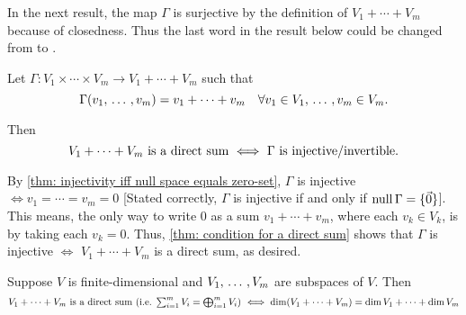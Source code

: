 In the next result, the map $\Gamma$ is surjective by the definition of $V_1 + \cdots + V_m$ because of closedness. Thus the last word in the result below could be changed from  to .

\begin{thm}
  \label{thm: products and direct sums}
  Let $\Gamma: V_1 \times \cdots \times V_m \to V_1 + \cdots + V_m$ such that
  \begin{equation}
    \Gamma(v_1, {\, \ldots \,\,}, v_m) = v_1 + \cdots + v_m \quad \forall v_1 \in V_1, {\, \ldots \,\,}, v_m \in V_m.
  \end{equation}

  Then
  \begin{equation}
    V_1 + \cdots + V_m$ is a direct sum $\iff$ $\Gamma$ is injective/invertible.$
  \end{equation}

\end{thm}
\begin{prf}
  By \ref{thm: injectivity iff null space equals zero-set}, $\Gamma$ is injective $\iff v_1 = \cdots = v_m = 0$ [Stated correctly, $\Gamma$ is injective if and only if $\operatorname{null} \Gamma = \{ \vec 0 \}$]. This means, the only way to write $0$ as a sum $v_1 + \cdots + v_m$, where each $v_k \in V_k$, is by taking each $v_k=0$. Thus, \ref{thm: condition for a direct sum} shows that $\Gamma$ is injective $\iff$ $V_1 + \cdots + V_m$ is a direct sum, as desired.
\end{prf}

\begin{thm}
  \label{thm: a sum is a direct sum if and only if the dimensions add up}
  Suppose $V$ is finite-dimensional and $V_1, {\, \ldots \,\,},V_m$ are subspaces of $V$. Then
  \begin{equation}
    V_1 + \cdots + V_m$ is a direct sum (i.e. $\sum_{i=1}^m V_i = \bigoplus_{i=1}^m V_i$) $\iff
    \dim (V_1+\cdots+V_m) = \dim V_1 + \cdots + \dim V_m
  \end{equation}
\end{thm}

